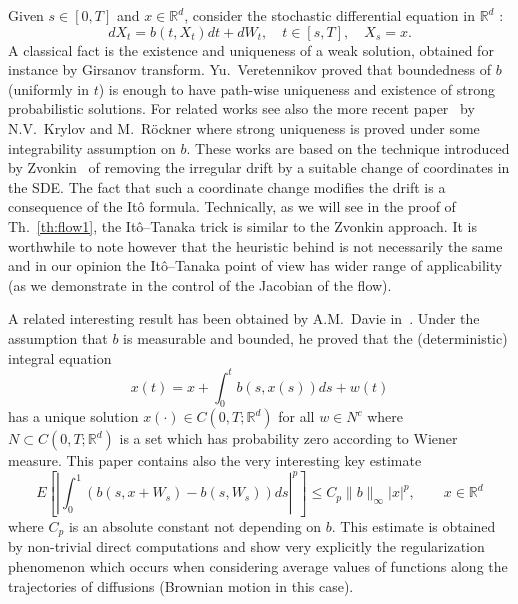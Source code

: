 \documentclass[a4paper,11pt]{article}
\begin{document}
Given $s\in \left[ 0,T\right] $ and $x\in {\mathbb{R}}^{d}$, consider the
stochastic differential equation in ${\mathbb{R}}^{d}$ :
\begin{equation}
dX_{t}=b\left( t,X_{t}\right) dt+dW_{t},\quad t\in \left[ s,T\right] ,\quad
X_{s}=x.  \label{SDE}
\end{equation}
A classical fact is the existence and uniqueness of a weak solution,
obtained for instance by Girsanov transform. Yu.~Veretennikov \cite{V}
proved that boundedness of $b$ (uniformly in $t$) is enough to have
path-wise uniqueness and existence of strong probabilistic solutions. For
related works see also the more recent paper~\cite{Kry-Ro} by N.V.~Krylov
and M.~R\"{o}ckner where strong uniqueness is proved under some
integrability assumption on $b$. These works are based on the technique
introduced by Zvonkin~\cite{Zvonkin} of removing the irregular drift by a
suitable change of coordinates in the SDE. The fact that such a coordinate
change modifies the drift is a consequence of the It\^{o} formula.
Technically, as we will see in the proof of Th.~\ref{th:flow1}, the
It\^{o}--Tanaka trick is similar to the Zvonkin approach. It is worthwhile
to note however that the heuristic behind is not necessarily the same and in
our opinion the It\^{o}--Tanaka point of view has wider range of
applicability (as we demonstrate in the control of the Jacobian of the flow).

A related interesting result has been obtained by A.M.~Davie in~\cite{D}.
Under the assumption that $b$ is measurable and bounded, he proved that the
(deterministic) integral equation
\begin{equation*}
x(t) = x + \int_0^t b(s,x(s)) ds + w(t)
\end{equation*}
has a unique solution $x(\cdot) \in C(0,T;\mathbb{R}^d)$ for all $w\in N^c$
where $N\subset C(0,T;\mathbb{R}^d)$ is a set which has probability zero
according to Wiener measure. This paper contains also the very interesting
key estimate
\begin{equation*}
E \left[\left| \int_0^1 (b(s,x+W_s)-b(s,W_s)) ds\right|^p\right] \le C_{p}
\|b\|_\infty |x|^p, \qquad x\in \mathbb{R}^d
\end{equation*}
where $C_p$ is an absolute constant not depending on $b$. This estimate is
obtained by non-trivial direct computations and show very explicitly the
regularization phenomenon which occurs when considering average values of
functions along the trajectories of diffusions (Brownian motion in this
case).
\end{document}
